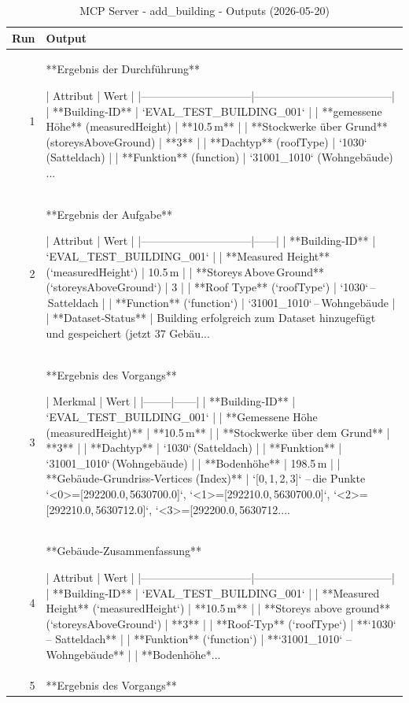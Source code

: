 \documentclass[a4paper,11pt]{article}
\begin{document}
\begin{table}[ht]
\centering
\scriptsize
\caption{MCP Server - add\_building - Outputs (2026-05-20)}
\label{tab:mcp\_add\_building\_outputs\_2026-05-20}
\begin{tabular}{r p{12cm}}
\hline
Run & Output \\
\hline
1 & **Ergebnis der Durchführung**

| Attribut                     | Wert                                 |
|------------------------------|--------------------------------------|
| **Building‑ID**              | `EVAL\_TEST\_BUILDING\_001`              |
| **gemessene Höhe** (measuredHeight) | **10.5 m** |
| **Stockwerke über Grund** (storeysAboveGround) | **3** |
| **Dachtyp** (roofType)       | `1030` (Satteldach)                  |
| **Funktion** (function)      | `31001\_1010` (Wohngebäude)         ... \\
2 & **Ergebnis der Aufgabe**

| Attribut                     | Wert |
|------------------------------|------|
| **Building‑ID**              | `EVAL\_TEST\_BUILDING\_001` |
| **Measured Height** (`measuredHeight`) | 10.5 m |
| **Storeys Above Ground** (`storeysAboveGround`) | 3 |
| **Roof Type** (`roofType`)   | `1030` – Satteldach |
| **Function** (`function`)    | `31001\_1010` – Wohngebäude |
| **Dataset‑Status**           | Building erfolgreich zum Dataset hinzugefügt und gespeichert (jetzt 37 Gebäu... \\
3 & **Ergebnis des Vorgangs**

| Merkmal | Wert |
|--------|------|
| **Building‑ID** | `EVAL\_TEST\_BUILDING\_001` |
| **Gemessene Höhe (measuredHeight)** | **10.5 m** |
| **Stockwerke über dem Grund** | **3** |
| **Dachtyp** | `1030` (Satteldach) |
| **Funktion** | `31001\_1010` (Wohngebäude) |
| **Bodenhöhe** | 198.5 m |
| **Gebäude‑Grundriss‑Vertices (Index)** | `[0, 1, 2, 3]` – die Punkte `<0>=[292200.0, 5630700.0]`, `<1>=[292210.0, 5630700.0]`, `<2>=[292210.0, 5630712.0]`, `<3>=[292200.0, 5630712.... \\
4 & **Gebäude‑Zusammenfassung**

| Attribut                     | Wert                                 |
|------------------------------|--------------------------------------|
| **Building‑ID**              | `EVAL\_TEST\_BUILDING\_001`             |
| **Measured Height** (`measuredHeight`) | **10.5 m** |
| **Storeys above ground** (`storeysAboveGround`) | **3** |
| **Roof‑Typ** (`roofType`)    | **`1030` – Satteldach** |
| **Funktion** (`function`)    | **`31001\_1010` – Wohngebäude** |
| **Bodenhöhe*... \\
5 & **Ergebnis des Vorgangs**


\end{tabular}
\end{table}
\end{document}

